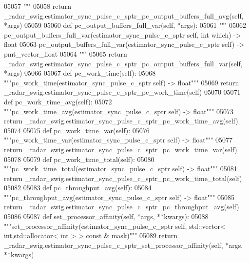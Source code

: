 \begin{DoxyCode}
{{{{{{{{{{{{{{{{{05057 \textcolor{stringliteral}{        """}
05058         \textcolor{keywordflow}{return} \_radar\_swig.estimator\_sync\_pulse\_c\_sptr\_pc\_output\_buffers\_full\_avg(self, *args)
05059 
05060     \textcolor{keyword}{def }pc_output_buffers_full_var(self, *args):
05061         \textcolor{stringliteral}{"""}
05062 \textcolor{stringliteral}{        pc\_output\_buffers\_full\_var(estimator\_sync\_pulse\_c\_sptr self, int which) -> float}
05063 \textcolor{stringliteral}{        pc\_output\_buffers\_full\_var(estimator\_sync\_pulse\_c\_sptr self) -> pmt\_vector\_float}
05064 \textcolor{stringliteral}{        """}
05065         \textcolor{keywordflow}{return} \_radar\_swig.estimator\_sync\_pulse\_c\_sptr\_pc\_output\_buffers\_full\_var(self, *args)
05066 
05067     \textcolor{keyword}{def }pc_work_time(self):
05068         \textcolor{stringliteral}{"""pc\_work\_time(estimator\_sync\_pulse\_c\_sptr self) -> float"""}
05069         \textcolor{keywordflow}{return} \_radar\_swig.estimator\_sync\_pulse\_c\_sptr\_pc\_work\_time(self)
05070 
05071     \textcolor{keyword}{def }pc_work_time_avg(self):
05072         \textcolor{stringliteral}{"""pc\_work\_time\_avg(estimator\_sync\_pulse\_c\_sptr self) -> float"""}
05073         \textcolor{keywordflow}{return} \_radar\_swig.estimator\_sync\_pulse\_c\_sptr\_pc\_work\_time\_avg(self)
05074 
05075     \textcolor{keyword}{def }pc_work_time_var(self):
05076         \textcolor{stringliteral}{"""pc\_work\_time\_var(estimator\_sync\_pulse\_c\_sptr self) -> float"""}
05077         \textcolor{keywordflow}{return} \_radar\_swig.estimator\_sync\_pulse\_c\_sptr\_pc\_work\_time\_var(self)
05078 
05079     \textcolor{keyword}{def }pc_work_time_total(self):
05080         \textcolor{stringliteral}{"""pc\_work\_time\_total(estimator\_sync\_pulse\_c\_sptr self) -> float"""}
05081         \textcolor{keywordflow}{return} \_radar\_swig.estimator\_sync\_pulse\_c\_sptr\_pc\_work\_time\_total(self)
05082 
05083     \textcolor{keyword}{def }pc_throughput_avg(self):
05084         \textcolor{stringliteral}{"""pc\_throughput\_avg(estimator\_sync\_pulse\_c\_sptr self) -> float"""}
05085         \textcolor{keywordflow}{return} \_radar\_swig.estimator\_sync\_pulse\_c\_sptr\_pc\_throughput\_avg(self)
05086 
05087     \textcolor{keyword}{def }set_processor_affinity(self, *args, **kwargs):
05088         \textcolor{stringliteral}{"""set\_processor\_affinity(estimator\_sync\_pulse\_c\_sptr self, std::vector< int,std::allocator< int >
       > const & mask)"""}
05089         \textcolor{keywordflow}{return} \_radar\_swig.estimator\_sync\_pulse\_c\_sptr\_set\_processor\_affinity(self, *args, **kwargs)
}}}}}}}}}}}}}}}}}
\end{DoxyCode}
